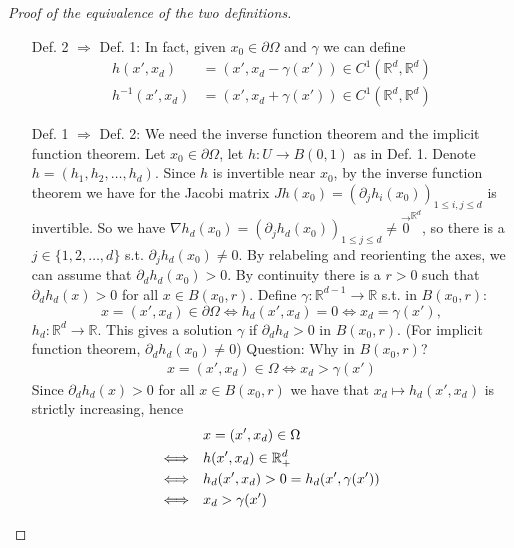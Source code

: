 \documentclass{report}
\theoremstyle{tommy}
\begin{document}
  \begin{proof}[Proof of the equivalence of the two definitions]\
    \begin{itemize}
      \item [Def. 2 \(\Rightarrow\) Def. 1:] In fact, given \(x_0 \in \partial \Omega\) and \(\gamma\) we can define
      \begin{align*}
        h(x', x_d) &= (x', x_d - \gamma(x')) \in C^1(\mathbb{R}^d, \mathbb{R}^d) \\
        h^{-1}(x', x_d) &= (x', x_d + \gamma(x')) \in C^1(\mathbb{R}^d, \mathbb{R}^d)
      \end{align*}
      \item [Def. 1 \(\Rightarrow\) Def. 2:] We need the inverse function theorem and the implicit function theorem. Let \(x_0 \in \partial \Omega\), let \(h: U \to B(0,1)\) as in Def. 1. Denote \(h = (h_1, h_2, \dots, h_d)\). Since \(h\) is invertible near \(x_0\), by the inverse function theorem we have for the Jacobi matrix \(J h(x_0) = (\partial_j h_i(x_0))_{1 \le i,j \le d}\) is invertible. So we have \(\nabla h_d(x_0) = (\partial_j h_d(x_0))_{1 \le j \le d} \ne \vec{0}^{\mathbb{R}^d}\), so there is a \(j \in \{1, 2, \dots, d\}\) s.t. \(\partial_j h_d(x_0) \ne 0\). By relabeling and reorienting the axes, we can assume that \(\partial_d h_d(x_0) > 0\). By continuity there is a \(r > 0\) such that \(\partial_d h_d(x) > 0\) for all \(x \in B(x_0, r)\). Define \(\gamma: \mathbb{R}^{d-1} \to \mathbb{R}\) s.t. in \(B(x_0, r)\):
      \begin{equation*}
        x = (x', x_d) \in \partial \Omega
        \Longleftrightarrow h_d(x', x_d) = 0
        \Longleftrightarrow x_d = \gamma(x'),
      \end{equation*}
      \(h_d: \mathbb{R}^d \to \mathbb{R}\). This gives a solution \(\gamma\) if \(\partial_d h_d > 0\) in \(B(x_0, r)\). (For implicit function theorem, \(\partial_d h_d(x_0) \ne 0\))
      Question: Why in \(B(x_0,r)\)?
      \begin{align*}
        x = (x', x_d) \in \Omega
        \Longleftrightarrow x_d > \gamma(x')
      \end{align*}
      Since \(\partial_d h_d(x) > 0\) for all \(x \in B(x_0, r)\) we have that \(x_d \mapsto h_d(x', x_d)\) is strictly increasing, hence 
      \begin{align*}
        &x = (x', x_d) \in \Omega \\
        \Longleftrightarrow \quad&h(x', x_d) \in \mathbb{R}_+^d \\
        \Longleftrightarrow \quad&h_d(x', x_d) > 0 = h_d(x', \gamma(x')) \\
        \Longleftrightarrow \quad& x_d > \gamma(x') \qedhere
      \end{align*}
    \end{itemize}
  \end{proof}
  
\end{document}
